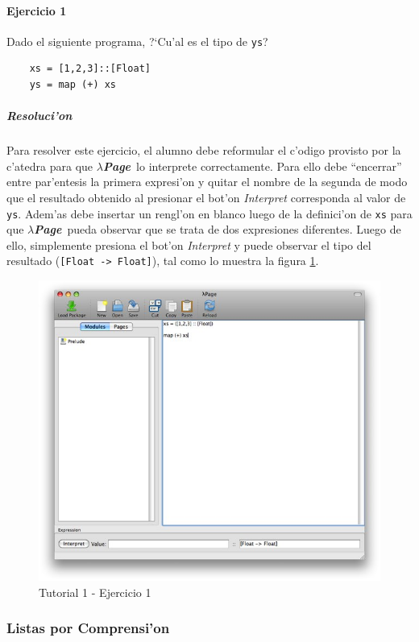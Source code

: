 \documentclass[a4paper]{article}
\newcommand{\hpage}{\textbf{\textsl{$\lambda$Page}}}
\begin{document}
\paragraph{Ejercicio 1}Dado el siguiente programa, ?`Cu'al es el tipo de \texttt{ys}?
\lstset{language=haskell, frame=single, tabsize=4}
\begin{center}\begin{lstlisting}
	xs = [1,2,3]::[Float]
	ys = map (+) xs
\end{lstlisting}\end{center}
\subparagraph{Resoluci'on}Para resolver este ejercicio, el alumno debe reformular el c'odigo provisto por la c'atedra para que \hpage\ lo interprete correctamente.  Para ello debe ``encerrar'' entre par'entesis la primera expresi'on y quitar el nombre de la segunda de modo que el resultado obtenido al presionar el bot'on \textsl{Interpret} corresponda al valor de \texttt{ys}.  Adem'as debe insertar un rengl'on en blanco luego de la definici'on de \texttt{xs} para que \hpage\ pueda observar que se trata de dos expresiones diferentes.  Luego de ello, simplemente presiona el bot'on \textsl{Interpret} y puede observar el tipo del resultado (\texttt{[Float -> Float]}), tal como lo muestra la figura \ref{tut101}.
\begin{figure}[hp]
	\begin{center}
        	\includegraphics[width=.75\textwidth]{pictures/tut1/01}
		\caption{Tutorial 1 - Ejercicio 1}
		\label{tut101}
	\end{center}
\end{figure}

\newpage
\subsubsection{Listas por Comprensi'on}
\end{document}
